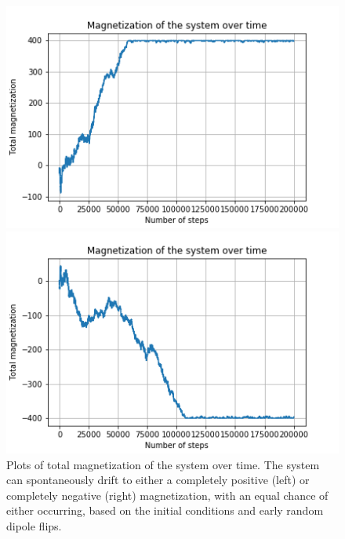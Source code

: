 \documentclass{article}
\begin{document}
\begin{figure}[H]
	\begin{minipage}{0.49\linewidth}
		\includegraphics[width=\linewidth]{../images/q2_magnetization_pos.png}
	\end{minipage}
	\begin{minipage}{0.49\linewidth}
		\includegraphics[width=\linewidth]{../images/q2_magnetization_neg.png}
	\end{minipage}
	\caption{Plots of total magnetization of the system over time. The system can spontaneously drift to either a completely positive (left) or completely negative (right) magnetization, with an equal chance of either occurring, based on the initial conditions and early random dipole flips.}
	\label{fig:q2_magnetization}
\end{figure}
\end{document}
